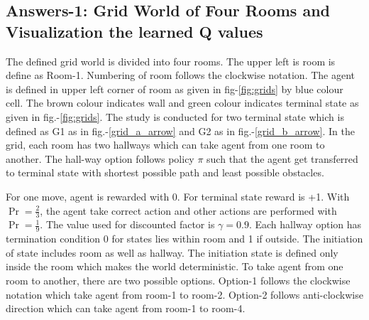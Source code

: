 \documentclass[preprint,12pt]{elsarticle}
\begin{document}
\subsection{Answers-1: Grid World of Four Rooms and Visualization the learned Q values}




The defined grid world is divided into four rooms. The upper left is room is define as Room-1. Numbering of room follows the clockwise notation. The agent is defined in upper left corner of room as given in fig-\ref{fig:grids} by blue colour cell. The brown colour indicates wall and green colour indicates terminal state as given in fig.-\ref{fig:grids}. The study is conducted for two terminal state which is defined as G1 as in fig.-\ref{grid_a_arrow} and G2 as in fig.-\ref{grid_b_arrow}. In the grid, each room has two hallways which can take agent from one room to another. The hall-way option follows policy $\pi$ such that the agent get transferred to terminal state with shortest possible path and least possible obstacles. 

For one move, agent is rewarded with 0. For terminal state reward is +1. With $\Pr = \frac{2}{3}$, the agent take correct action and other actions are performed with $\Pr = \frac{1}{9}$. The value used for discounted factor is $\gamma=0.9$. Each hallway option has termination condition 0 for states lies within room and 1 if outside. The initiation of state includes room as well as hallway. The initiation state is defined only inside the room which makes the world deterministic. To take agent from one room to another, there are two possible options. Option-1 follows the clockwise notation which take agent from room-1 to room-2. Option-2 follows anti-clockwise direction which can take agent from room-1 to room-4.
\end{document}
